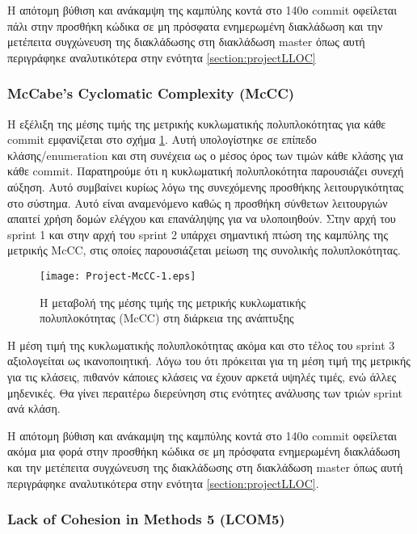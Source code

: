 Η απότομη βύθιση και ανάκαμψη της καμπύλης κοντά στο 140ο commit
οφείλεται πάλι στην προσθήκη κώδικα σε μη πρόσφατα ενημερωμένη
διακλάδωση και την μετέπειτα συγχώνευση της διακλάδωσης στη
διακλάδωση master όπως αυτή περιγράφηκε αναλυτικότερα
στην ενότητα \ref{section:projectLLOC}

\subsubsection{McCabe's Cyclomatic Complexity (McCC)}

Η εξέλιξη της μέσης τιμής της μετρικής κυκλωματικής πολυπλοκότητας για
κάθε commit εμφανίζεται στο σχήμα \ref{fig:projectMcCC}. Αυτή υπολογίστηκε σε
επίπεδο κλάσης/enumeration και στη συνέχεια ως ο μέσος όρος των τιμών
κάθε κλάσης για κάθε commit. Παρατηρούμε ότι η κυκλωματική πολυπλοκότητα
παρουσιάζει συνεχή αύξηση. Αυτό συμβαίνει κυρίως λόγω της συνεχόμενης
προσθήκης λειτουργικότητας στο σύστημα. Αυτό είναι αναμενόμενο καθώς η
προσθήκη σύνθετων λειτουργιών απαιτεί χρήση δομών ελέγχου και επανάληψης
για να υλοποιηθούν. Στην αρχή του sprint 1 και στην αρχή του sprint 2
υπάρχει σημαντική πτώση της καμπύλης της μετρικής McCC, στις οποίες
παρουσιάζεται μείωση της συνολικής πολυπλοκότητας.

\begin{figure}
\centering
\texttt{[image: Project-McCC-1.eps]}
\caption{Η μεταβολή της μέσης τιμής της μετρικής κυκλωματικής
	πολυπλοκότητας (McCC) στη διάρκεια της ανάπτυξης}
\label{fig:projectMcCC}
\end{figure}

Η μέση τιμή της κυκλωματικής πολυπλοκότητας ακόμα και στο τέλος του
sprint 3 αξιολογείται ως ικανοποιητική. Λόγω του ότι πρόκειται για τη
μέση τιμή της μετρικής για τις κλάσεις, πιθανόν κάποιες κλάσεις να έχουν
αρκετά υψηλές τιμές, ενώ άλλες μηδενικές. Θα γίνει περαιτέρω διερεύνηση
στις ενότητες ανάλυσης των τριών sprint ανά κλάση.

Η απότομη βύθιση και ανάκαμψη της καμπύλης κοντά στο 140ο commit
οφείλεται ακόμα μια φορά στην προσθήκη κώδικα σε μη πρόσφατα ενημερωμένη
διακλάδωση και την μετέπειτα συγχώνευση της διακλάδωσης στη διακλάδωση
master όπως αυτή περιγράφηκε αναλυτικότερα στην ενότητα
\ref{section:projectLLOC}.

\subsubsection{Lack of Cohesion in Methods 5 (LCOM5)}

